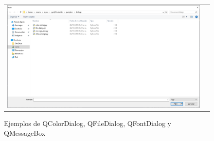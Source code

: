 \begin{figure}[H]
\begin{tabular}{c c}
        \includegraphics[scale=0.2]{imagenes/qtdesigner/qt_file_dialog.PNG} 
    \end{tabular}
    \caption{Ejemplos de QColorDialog, QFileDialog, QFontDialog y QMessageBox}
    \label{fig:qt_dialog_examples}
\end{figure}


